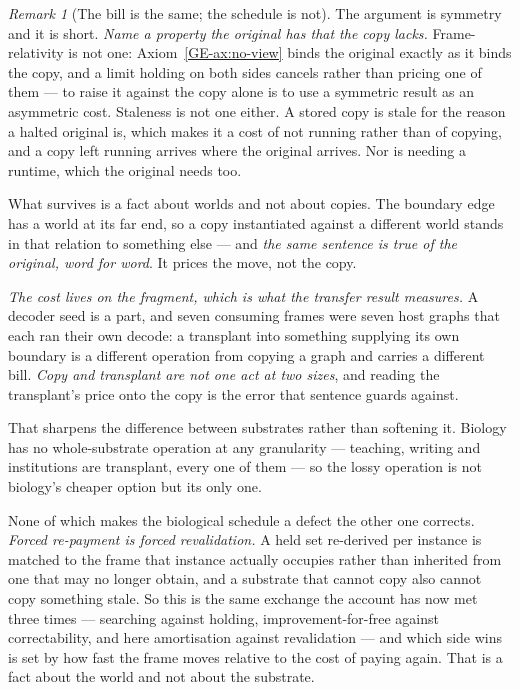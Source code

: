 \documentclass[11pt,a4paper]{article}
\theoremstyle{remark}
\newtheorem{remark}[definition]{Remark}
\begin{document}
\begin{remark}[The bill is the same; the schedule is not]
The argument is symmetry and it is short. \emph{Name a property the original has that the copy lacks.}
Frame-relativity is not one: Axiom~\ref{GE-ax:no-view} binds the original exactly as it binds the copy, and a limit
holding on both sides cancels rather than pricing one of them --- to raise it against the copy alone is
to use a symmetric result as an asymmetric cost. Staleness is not one either. A stored copy is stale
for the reason a halted original is, which makes it a cost of not running rather than of copying, and a
copy left running arrives where the original arrives. Nor is needing a runtime, which the original
needs too.

What survives is a fact about worlds and not about copies. The boundary edge has a world at its far
end, so a copy instantiated against a different world stands in that relation to something else --- and
\emph{the same sentence is true of the original, word for word}. It prices the move, not the copy.

\emph{The cost lives on the fragment, which is what the transfer result measures.} A decoder seed is a
part, and seven consuming frames were seven host graphs that each ran their own decode: a transplant
into something supplying its own boundary is a different operation from copying a graph and carries a
different bill. \emph{Copy and transplant are not one act at two sizes}, and reading the transplant's
price onto the copy is the error that sentence guards against.

That sharpens the difference between substrates rather than softening it. Biology has no whole-substrate
operation at any granularity --- teaching, writing and institutions are transplant, every one of them
--- so the lossy operation is not biology's cheaper option but its only one.

None of which makes the biological schedule a defect the other one corrects. \emph{Forced
re-payment is forced revalidation.} A held set re-derived per instance is matched to the frame that
instance actually occupies rather than inherited from one that may no longer obtain, and a substrate
that cannot copy also cannot copy something stale. So this is the same exchange the account has now met
three times --- searching against holding, improvement-for-free against correctability, and here
amortisation against revalidation --- and which side wins is set by how fast the frame moves relative
to the cost of paying again. That is a fact about the world and not about the substrate.


\end{remark}
\end{document}
